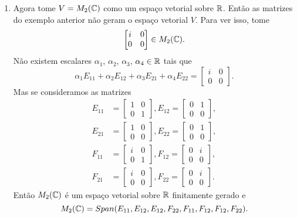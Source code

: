 \begin{exemplos}
\begin{enumerate}
        \item Agora tome $V = M_2(\mathbb{C})$ como um espaço vetorial sobre $\mathbb{R}$. Então as matrizes do exemplo anterior não geram o espaço vetorial $V$. Para ver isso, tome
        \[
            \begin{bmatrix}
                i & 0\\0 & 0
            \end{bmatrix} \in M_2(\mathbb{C}).
        \]
        Não existem escalares $\alpha_1$, $\alpha_2$, $\alpha_3$, $\alpha_4 \in \mathbb{R}$ tais que
        \[
            \alpha_1E_{11} + \alpha_2E_{12} + \alpha_3E_{21} + \alpha_4E_{22} = \begin{bmatrix}i & 0\\0 & 0\end{bmatrix}.
        \]
        Mas se consideramos as matrizes
        \begin{align*}
            E_{11} &= \begin{bmatrix}1 & 0\\0 & 1\end{bmatrix},
            E_{12} = \begin{bmatrix}0 & 1\\0 &0 \end{bmatrix},\\
            E_{21} &= \begin{bmatrix}1 & 0\\0 & 0\end{bmatrix},
            E_{22} = \begin{bmatrix}0 & 1\\0 & 0\end{bmatrix},\\
            F_{11} &= \begin{bmatrix}i & 0\\0 & 1\end{bmatrix},
            F_{12} = \begin{bmatrix}0 & i\\0 &0 \end{bmatrix},\\
            F_{21} &= \begin{bmatrix}i & 0\\0 & 0\end{bmatrix},
            F_{22} = \begin{bmatrix}0 & i\\0 & 0\end{bmatrix}.
        \end{align*}
        Então $M_2(\mathbb{C})$ é um espaço vetorial sobre $\mathbb{R}$ finitamente gerado e
        \[
            M_2(\mathbb{C}) = Span(E_{11}, E_{12}, E_{12}, F_{22}, F_{11}, F_{12}, F_{12}, F_{22}).
        \]


\end{enumerate}
\end{exemplos}
